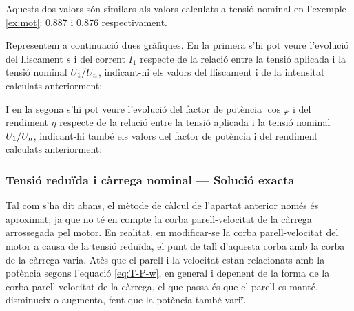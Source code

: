 \begin{exemple}
	Aquests dos valors són similars als valors calculats a tensió nominal en  l'exemple \ref{ex:mot}: 0,887 i 0,876 respectivament.
	
	Representem a continuació dues gràfiques. En la primera s'hi pot veure  l'evolució del lliscament $s$ i del corrent $I_1$ respecte de la relació entre la tensió aplicada i la tensió nominal $U_1/U_\mathrm{n}$, indicant-hi els valors del lliscament i de la intensitat calculats anteriorment:
	\begin{center}
		
	\end{center}

	I en la segona s'hi pot veure l'evolució del factor de potència $\cos\varphi$ i del rendiment $\eta$ respecte de la relació entre la tensió aplicada i la tensió nominal $U_1/U_\mathrm{n}$, indicant-hi també  els valors del factor de potència i del rendiment calculats anteriorment:
	\begin{center}
		
	\end{center}	
\end{exemple}

\subsubsection{Tensió reduïda i càrrega nominal --- Solució exacta}

Tal com s'ha dit abans, el mètode de càlcul de l'apartat anterior només és aproximat, ja que no té en compte la corba parell-velocitat de la càrrega arrossegada pel motor. En realitat, en modificar-se la corba parell-velocitat del motor a causa de la tensió reduïda, el punt de tall d'aquesta corba amb la corba de la càrrega varia. Atès que el parell i la velocitat estan relacionats amb la potència segons l'equació  \eqref{eq:T-P-w}, en general i depenent de la forma de la corba parell-velocitat de la càrrega, el que passa és que el parell es manté,  disminueix o augmenta, fent que la potència també variï.

